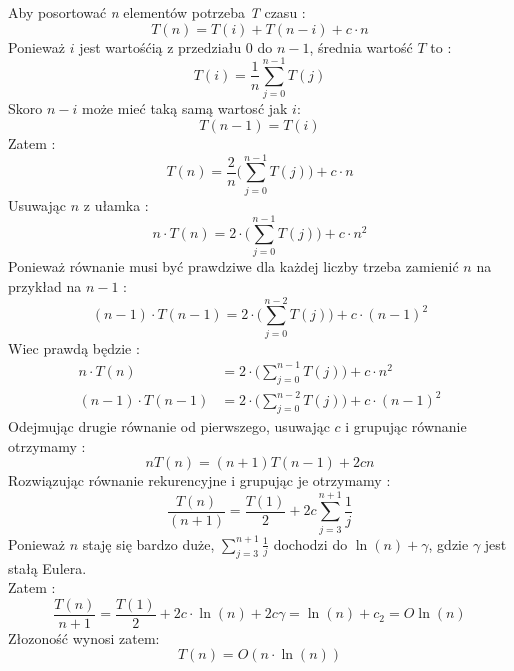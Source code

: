 Aby posortować \textit{n} elementów potrzeba \textit{T} czasu :
\begin{equation*}
T(n)=T(i)+T(n-i)+c \cdot n
\end{equation*}
Ponieważ $i$ jest wartośćią z przedziału $0$ do $n-1$, średnia wartość $T$ to :
\begin{equation*}
T(i)=\frac{1}{n}\sum_{j=0}^{n-1}T(j)
\end{equation*}
Skoro $n-i$ może mieć taką samą wartosć jak $i$:
\begin{equation*}
T(n-1) = T(i)
\end{equation*}
Zatem :
\begin{equation*}
T(n)=\frac{2}{n} \Bigg( \sum_{j=0}^{n-1}T(j)\Bigg) + c \cdot n
\end{equation*}
Usuwając $n$ z ułamka  :
\begin{equation*}
n \cdot T(n)=2 \cdot \Bigg( \sum_{j=0}^{n-1}T(j)\Bigg) + c \cdot n^{2}
\end{equation*}
Ponieważ równanie musi być prawdziwe dla każdej liczby trzeba zamienić $n$ na przykład na $n-1$ :
\begin{equation*}
(n-1) \cdot T(n-1)=2 \cdot \Bigg( \sum_{j=0}^{n-2}T(j)\Bigg) + c \cdot (n-1)^{2}
\end{equation*}
Wiec prawdą będzie :
\begin{align*}
n \cdot T(n)&=2 \cdot \Bigg( \sum_{j=0}^{n-1}T(j)\Bigg) + c \cdot n^{2}\\
(n-1) \cdot T(n-1)&=2 \cdot \Bigg( \sum_{j=0}^{n-2}T(j)\Bigg) + c \cdot (n-1)^{2}
 \end{align*}
 Odejmując drugie równanie od pierwszego, usuwając $c$ i grupując równanie otrzymamy :
 \begin{equation*}
 nT(n)=(n+1)T(n-1)+2cn
 \end{equation*}
Rozwiązując równanie rekurencyjne i grupując je otrzymamy :
\begin{equation*}
 \frac{T(n)}{(n+1)} = \frac{T(1)}{2} + 2 c \sum_{j=3}^{n+1} \frac{1}{j}
\end{equation*}
Ponieważ $n$ staję się bardzo duże, $\sum_{j=3}^{n+1} \frac{1}{j}$ dochodzi do $\ln(n) +\gamma $, gdzie $\gamma$ jest stałą Eulera.\\
Zatem :
\begin{equation*}
 \frac{T(n)}{n+1} = \frac{T(1)}{2} + 2 c \cdot \ln(n) + 2 c \gamma = \ln(n) + c_2 = O \ln(n) 
\end{equation*}
Złozoność wynosi zatem:
\begin{equation*}
 T(n)=O (n \cdot \ln(n)) 
 \end{equation*}

